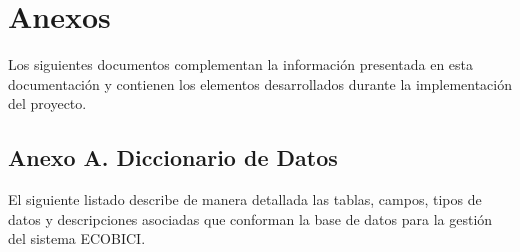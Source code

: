 \section{Anexos}
\label{sec:anexos}

Los siguientes documentos complementan la información presentada en esta documentación y contienen los elementos desarrollados durante la implementación del proyecto.

\subsection{Anexo A. Diccionario de Datos}
\label{sec:anexo_a}

El siguiente listado describe de manera detallada las tablas, campos, tipos de datos y descripciones asociadas que conforman la base de datos para la gestión del sistema ECOBICI.

